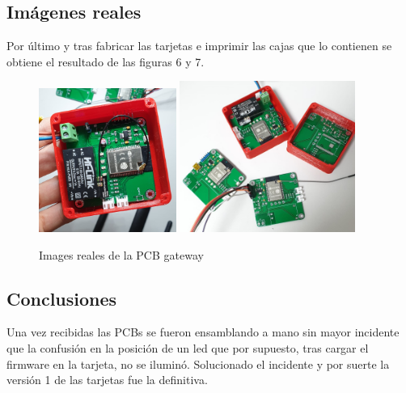 \documentclass[paper=a4, fontsize=11pt,twoside]{scrartcl}	%
\begin{document}
    \subsection{Imágenes reales}
        Por último y tras fabricar las tarjetas e imprimir las cajas que lo contienen se obtiene el resultado de las figuras 6 y 7.
        \begin{center}
            \begin{figure}[ht]
                \centering
                \includegraphics[width=0.4\textwidth]{../3d_antenna.jpeg}
                \includegraphics[width=0.51\textwidth]{../real_master_pcb.jpeg}
                \caption{Images reales de la PCB gateway}
                \label{fig:mesh7}
            \end{figure}    
        \end{center}


    \subsection{Conclusiones}
        Una vez recibidas las PCBs se fueron ensamblando a mano sin mayor incidente que la confusión en la 
        posición de un led que por supuesto, tras cargar el firmware en la tarjeta, no se iluminó.
        Solucionado el incidente y por suerte la versión 1 de las tarjetas fue la definitiva.
\end{document}
